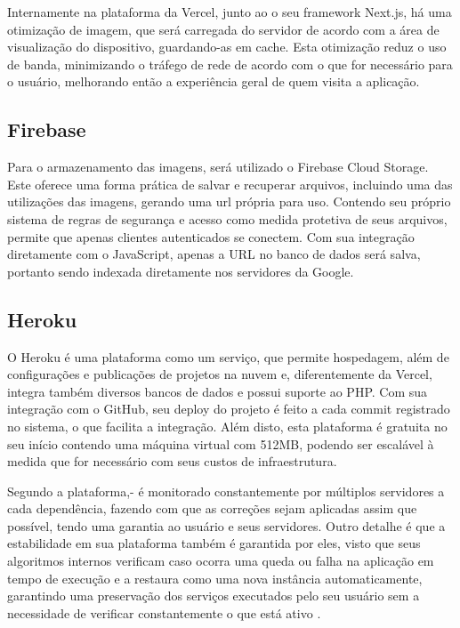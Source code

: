 Internamente na plataforma da Vercel, junto ao o seu framework Next.js, há uma otimização de imagem, que será carregada do servidor de acordo com a área de visualização do dispositivo, guardando-as em cache. Esta otimização reduz o uso de banda, minimizando o tráfego de rede de acordo com o que for necessário para o usuário, melhorando então a experiência geral de quem visita a aplicação.

\subsection{Firebase}
Para o armazenamento das imagens, será utilizado o Firebase Cloud Storage. Este oferece uma forma prática de salvar e recuperar arquivos, incluindo uma das utilizações das imagens, gerando uma url própria para uso. Contendo seu próprio sistema de regras de segurança e acesso como medida protetiva de seus arquivos, permite que apenas clientes autenticados se conectem. Com sua integração diretamente com o JavaScript, apenas a URL no banco de dados será salva, portanto sendo indexada diretamente nos servidores da Google.\cite{FIREBASE}

\subsection{Heroku}
O Heroku é uma plataforma como um serviço, que permite hospedagem, além de configurações e publicações de projetos na nuvem e, diferentemente da Vercel, integra também diversos bancos de dados e possui suporte ao PHP. Com sua integração com o GitHub, seu deploy do projeto é feito a cada commit registrado no sistema, o que facilita a integração. Além disto, esta plataforma é gratuita no seu início contendo uma máquina virtual com 512MB, podendo ser escalável à medida que for necessário com seus custos de infraestrutura. 

Segundo a plataforma,- é monitorado constantemente por múltiplos servidores a cada dependência, fazendo com que as correções sejam aplicadas assim que possível, tendo uma garantia ao usuário e seus servidores.  Outro detalhe é que a estabilidade em sua plataforma também é garantida por eles, visto que seus algoritmos internos verificam caso ocorra uma queda ou falha na aplicação em tempo de execução e a restaura como uma nova instância automaticamente, garantindo uma preservação dos serviços executados pelo seu usuário sem a necessidade de verificar constantemente o que está ativo \cite{HEROKU}.

